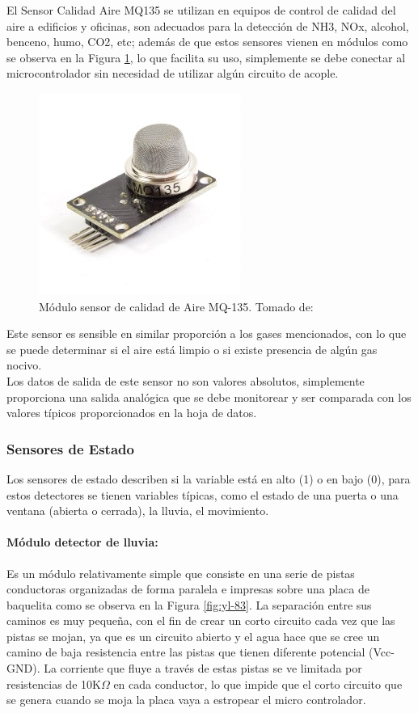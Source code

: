 El Sensor Calidad Aire MQ135 se utilizan en equipos de control de calidad del aire a edificios y oficinas, son adecuados para la detección de NH3, NOx, alcohol, benceno, humo, CO2, etc; además de que estos sensores vienen en módulos como se observa en la Figura \ref{fig:sensor-calidad-aire-mq135}, lo que facilita su uso, simplemente se debe conectar al microcontrolador sin necesidad de utilizar algún circuito de acople. \cite{MQ1}

\begin{figure}[H]
	\centering
	\caption[Módulo sensor de calidad de Aire MQ-135.]{Módulo sensor de calidad de Aire MQ-135. Tomado de: \cite{MQ1}}
	\label{fig:sensor-calidad-aire-mq135}
 	\includegraphics[width=0.35\linewidth]{Imagenes/sensor-calidad-aire-mq135}
\end{figure}

Este sensor es sensible en similar proporción a los gases mencionados, con lo que se puede determinar si el aire está limpio o si existe presencia de algún gas nocivo.\\

Los datos de salida de este sensor no son valores absolutos, simplemente proporciona una salida analógica que se debe monitorear y ser comparada con los valores típicos proporcionados en la hoja de datos.\cite{MQ2}

\subsubsection{Sensores de Estado}

Los sensores de estado describen si la variable está en alto (1) o en bajo (0), para estos detectores se tienen variables típicas, como el estado de una puerta o una ventana (abierta o cerrada), la lluvia, el movimiento.

\paragraph{Módulo detector de lluvia: }

Es un módulo relativamente simple que consiste en una serie de pistas conductoras organizadas de forma paralela e impresas sobre una placa de baquelita como se observa en la Figura \ref{fig:yl-83}. La separación entre sus caminos es muy pequeña, con el fin de crear un corto circuito cada vez que las pistas se mojan, ya que es un circuito abierto y el agua hace que se cree un camino de baja resistencia entre las pistas que tienen diferente potencial (Vcc-GND). La corriente que fluye a través de estas pistas se ve limitada por resistencias de 10K$\Omega$ en cada conductor, lo que impide que el corto circuito que se genera cuando se moja la placa vaya a estropear el micro controlador.\cite{LLU}

